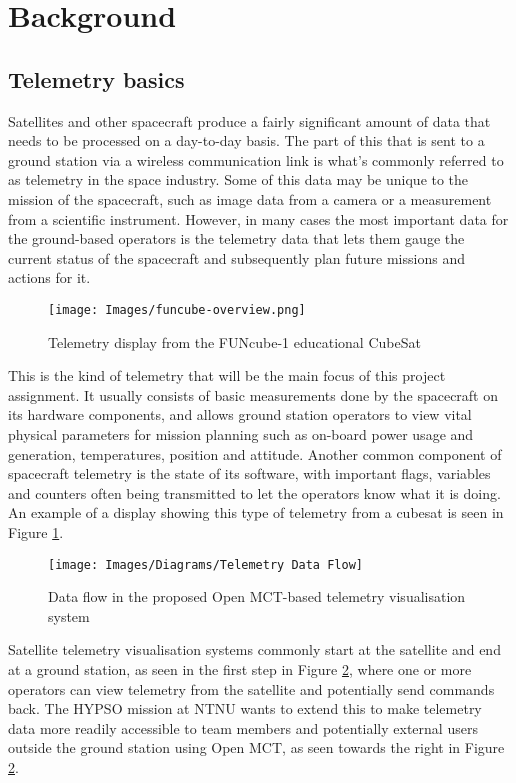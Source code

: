 \section{Background}

\subsection{Telemetry basics}
Satellites and other spacecraft produce a fairly significant amount of data that needs to be processed on a day-to-day basis. The part of this that is sent to a ground station via a wireless communication link is what's commonly referred to as \gls{telemetry} in the space industry. Some of this data may be unique to the mission of the spacecraft, such as image data from a camera or a measurement from a scientific instrument. However, in many cases the most important data for the ground-based operators is the telemetry data that lets them gauge the current status of the spacecraft and subsequently plan future missions and actions for it.

\begin{figure}[ht]
    \centering
    \texttt{[image: Images/funcube-overview.png]}
    \caption{Telemetry display from the FUNcube-1 educational CubeSat \cite{funcube}}
    \label{fig:funcube}
\end{figure}

This is the kind of telemetry that will be the main focus of this project assignment. It usually consists of basic measurements done by the spacecraft on its hardware components, and allows ground station operators to view vital physical parameters for mission planning such as on-board power usage and generation, temperatures, position and attitude. Another common component of spacecraft telemetry is the state of its software, with important flags, variables and counters often being transmitted to let the operators know what it is doing. An example of a display showing this type of telemetry from a \Gls{cubesat} is seen in Figure \ref{fig:funcube}.

\begin{figure}[ht]
    \centering
    \texttt{[image: Images/Diagrams/Telemetry Data Flow]}
    \caption{Data flow in the proposed Open MCT-based telemetry visualisation system}
    \label{fig:telemetryflow}
\end{figure}

Satellite telemetry visualisation systems commonly start at the satellite and end at a ground station, as seen in the first step in Figure \ref{fig:telemetryflow}, where one or more operators can view telemetry from the satellite and potentially send commands back. The HYPSO mission at NTNU wants to extend this to make telemetry data more readily accessible to team members and potentially external users outside the ground station using Open MCT, as seen towards the right in Figure \ref{fig:telemetryflow}.


